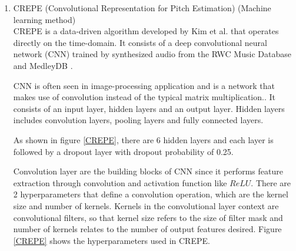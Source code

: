 \begin{enumerate}
\begin{figure}
\begin{subfigure}{.3\textwidth}
		  \caption{$r_t(\tau)$ calculated with equation \ref{signal}}
		  \label{taped}
		\end{subfigure}%
		\label{YIN}
	\end{figure}
	
	We then select the highest peak by exhaustive search within an user-defined range of lags, the corresponding time lag will be
	the inverse of our estimated $f_0$.

	To improve the error rates and target periodicity, de Cheveigné \& Kawahara introduced a cumulative mean normalized difference function (CMNDF)
	to replace ACF. 
	\begin{equation}
		CMNDF(\tau) = \begin{cases}
			 1             & \text{if $\tau = 0$} \\ 
    		\frac{DF(\tau)}{(1/\tau)\sum_{j=1}{\tau} DF(j)} & \text{otherwise.}
		\end{cases}
	\end{equation}
	
	We then find $\tau$ that minimises $CMNDF(\tau)$ and the corresponding $f_0$.

	\item CREPE (Convolutional Representation for Pitch Estimation) (Machine learning method)\\
	CREPE is a data-driven algorithm developed by Kim et al. that operates directly on the time-domain.
	It consists of a deep convolutional neural network (CNN) trained by synthesized audio from the RWC Music Database 
	and MedleyDB . 

	CNN is often seen in image-processing application and is a network that makes use of convolution instead of the typical matrix multiplication..
	It consists of an input layer, hidden layers and an output layer. Hidden layers includes convolution layers, pooling layers and fully connected layers.
	
	As shown in figure \ref{CREPE}, there are 6 hidden layers and each layer is followed by a dropout layer with dropout probability of 0.25. 

	Convolution layer are the building blocks of CNN since it performs feature extraction through convolution and activation function like $ReLU$.
	There are 2 hyperparameters that define a convolution operation, which are the kernel size and number of kernels. Kernels in the convolutional layer context are convolutional
	filters, so that kernel size refers to the size of filter mask and number of kernels relates to the number of output features desired. Figure \ref{CREPE} shows the hyperparameters
	used in CREPE.


\end{enumerate}
